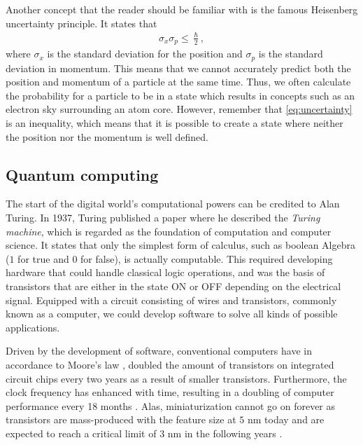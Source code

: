 
Another concept that the reader should be familiar with is the famous Heisenberg uncertainty principle. It states that
\begin{align}
    \sigma_x \sigma_p \leq \frac{\hslash}{2},
    \label{eq:uncertainty}
\end{align}
where $\sigma_x$ is the standard deviation for the position and $\sigma_p$ is the standard deviation in momentum. This means that we cannot accurately predict both the position and momentum of a particle at the same time. Thus, we often calculate the probability for a particle to be in a state which results in concepts such as an electron sky surrounding an atom core. However, remember that \autoref{eq:uncertainty} is an inequality, which means that it is possible to create a state where neither the position nor the momentum is well defined.

\subsection{Quantum computing}
The start of the digital world's computational powers can be credited to Alan Turing. In 1937, Turing \cite{Turing1937} published a paper where he described the \textit{Turing machine}, which is regarded as the foundation of computation and computer science. It states that only the simplest form of calculus, such as boolean Algebra ($1$ for true and $0$ for false), is actually computable. This required developing hardware that could handle classical logic operations, and was the basis of transistors that are either in the state ON or OFF depending on the electrical signal. Equipped with a circuit consisting of wires and transistors, commonly known as a computer, we could develop software to solve all kinds of possible applications.

Driven by the development of software, conventional computers have in accordance to Moore's law \cite{Moore1965}, doubled the amount of transistors on integrated circuit chips every two years as a result of smaller transistors. Furthermore, the clock frequency has enhanced with time, resulting in a doubling of computer performance every 18 months \cite{Pavicic2006}. Alas, miniaturization cannot go on forever as transistors are mass-produced with the feature size at $5$ nm today and are expected to reach a critical limit of $3$ nm in the following years \cite{Gwennap2020}.


